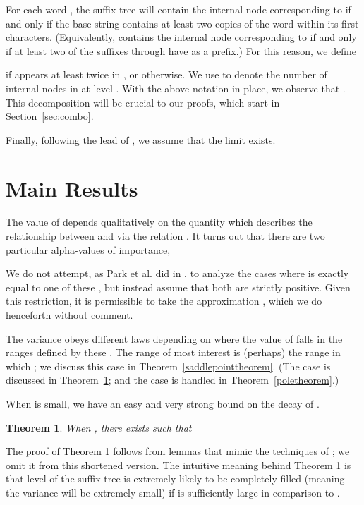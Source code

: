 \documentclass[proceedings]{aofa}
\newtheorem{theorem}{Theorem}
\begin{document}
For each word , the suffix tree  will
contain the internal node corresponding to  if and only if the base-string
 contains at least two copies of the word  within its first 
characters.  (Equivalently,  
contains the internal node corresponding to  if and only if at
least two of the suffixes  through  have  as a prefix.)
For this reason, we define

if  appears at least twice in , 
or  otherwise.
We use  to denote the number of internal nodes in
 at level .
With the above notation in place, we observe that 
.  This decomposition will be crucial to our
proofs, which start in Section~\ref{sec:combo}.

Finally, following the lead of \cite{Park:2009}, we assume that the limit  exists.

\section{Main Results}\label{intro}
The value of  depends qualitatively on the quantity  which describes the relationship between  and  via the relation . It turns out that there are two particular alpha-values of importance,

We do not attempt, as Park et al. did in \cite{Park:2009}, to analyze
the cases where  is exactly equal to one of these
, but instead assume that both  are
strictly positive. Given this restriction, it is permissible to take the approximation , which we do henceforth without comment.


The variance obeys different laws depending on where the value of  falls in the ranges defined by these . 
The range of most interest is (perhaps) the range in which ; we discuss this case in Theorem~\ref{saddlepointtheorem}.
(The case  is discussed in 
Theorem~\ref{smallalphatheorem};
 and the case  is handled in
Theorem~\ref{poletheorem}.)

When  is small, we have an easy and very strong bound on the decay of .
\begin{theorem}\label{smallalphatheorem}
When , there exists  such that 
 
\end{theorem}

The proof of Theorem \ref{smallalphatheorem} follows from lemmas that
mimic the techniques of \cite{Markthesis}; we omit it from this shortened version. The intuitive meaning behind Theorem \ref{smallalphatheorem}
is that level  of the suffix tree is extremely likely to be
completely filled (meaning the variance will be extremely small) if
 is sufficiently large in comparison to .
\end{document}
